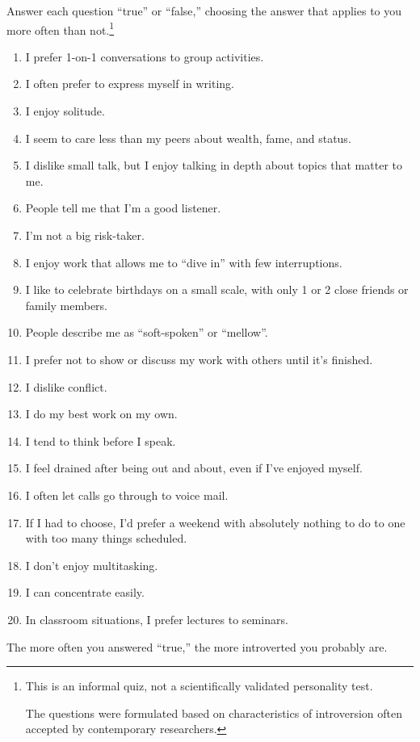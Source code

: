 \documentclass[oneside]{article}
\numberwithin{equation}{section}
\begin{document}
Answer each question ``true'' or ``false,'' choosing the answer that applies to you more often than not.\footnote{This is an informal quiz, not a scientifically validated personality test.

The questions were formulated based on characteristics of introversion often accepted by contemporary researchers.}
\begin{enumerate}
    \item I prefer 1-on-1 conversations to group activities.
    \item I often prefer to express myself in writing.
    \item I enjoy solitude.
    \item I seem to care less than my peers about wealth, fame, and status.
    \item I dislike small talk, but I enjoy talking in depth about topics that matter to me.
    \item People tell me that I'm a good listener.
    \item I'm not a big risk-taker.
    \item I enjoy work that allows me to ``dive in'' with few interruptions.
    \item I like to celebrate birthdays on a small scale, with only 1 or 2 close friends or family members.
    \item People describe me as ``soft-spoken'' or ``mellow''.
    \item I prefer not to show or discuss my work with others until it's finished.
    \item I dislike conflict.
    \item I do my best work on my own.
    \item I tend to think before I speak.
    \item I feel drained after being out and about, even if I've enjoyed myself.
    \item I often let calls go through to voice mail.
    \item If I had to choose, I'd prefer a weekend with absolutely nothing to do to one with too many things scheduled.
    \item I don't enjoy multitasking.
    \item I can concentrate easily.
    \item In classroom situations, I prefer lectures to seminars.
\end{enumerate}
%
The more often you answered ``true,'' the more introverted you probably are.
\end{document}
